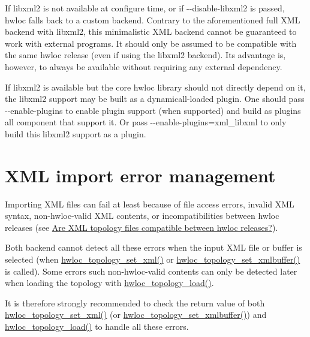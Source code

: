 If libxml2 is not available at configure time, or if {\ttfamily -\/-\/disable-\/libxml2} is passed, hwloc falls back to a custom backend. Contrary to the aforementioned full X\+ML backend with libxml2, this minimalistic X\+ML backend cannot be guaranteed to work with external programs. It should only be assumed to be compatible with the same hwloc release (even if using the libxml2 backend). Its advantage is, however, to always be available without requiring any external dependency.

If libxml2 is available but the core hwloc library should not directly depend on it, the libxml2 support may be built as a dynamicall-\/loaded plugin. One should pass {\ttfamily -\/-\/enable-\/plugins} to enable plugin support (when supported) and build as plugins all component that support it. Or pass {\ttfamily -\/-\/enable-\/plugins=xml\+\_\+libxml} to only build this libxml2 support as a plugin.

 \hypertarget{a00388_xml_errors}{}\section{X\+M\+L import error management}\label{a00388_xml_errors}
Importing X\+ML files can fail at least because of file access errors, invalid X\+ML syntax, non-\/hwloc-\/valid X\+ML contents, or incompatibilities between hwloc releases (see \hyperlink{a00394_faq_version_xml}{Are X\+ML topology files compatible between hwloc releases?}).

Both backend cannot detect all these errors when the input X\+ML file or buffer is selected (when \hyperlink{a00192_ga879439b7ee99407ee911b3ac64e9a25e}{hwloc\+\_\+topology\+\_\+set\+\_\+xml()} or \hyperlink{a00192_ga2745616b65595e1c1e579ecc7e461fa8}{hwloc\+\_\+topology\+\_\+set\+\_\+xmlbuffer()} is called). Some errors such non-\/hwloc-\/valid contents can only be detected later when loading the topology with \hyperlink{a00186_gabdf58d87ad77f6615fccdfe0535ff826}{hwloc\+\_\+topology\+\_\+load()}.

It is therefore strongly recommended to check the return value of both \hyperlink{a00192_ga879439b7ee99407ee911b3ac64e9a25e}{hwloc\+\_\+topology\+\_\+set\+\_\+xml()} (or \hyperlink{a00192_ga2745616b65595e1c1e579ecc7e461fa8}{hwloc\+\_\+topology\+\_\+set\+\_\+xmlbuffer()}) and \hyperlink{a00186_gabdf58d87ad77f6615fccdfe0535ff826}{hwloc\+\_\+topology\+\_\+load()} to handle all these errors. 
